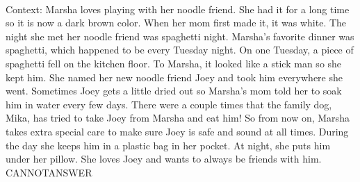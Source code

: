 \documentclass[11pt,a4paper, onecolumn]{article}
\begin{document}
\\ Context: Marsha loves playing with her noodle friend. She had it for a long time so it is now a dark brown color. When her mom first made it, it was white. The night she met her noodle friend was spaghetti night. Marsha's favorite dinner was spaghetti, which happened to be every Tuesday night. On one Tuesday, a piece of spaghetti fell on the kitchen floor. To Marsha, it looked like a stick man so she kept him. She named her new noodle friend Joey and took him everywhere she went. Sometimes Joey gets a little dried out so Marsha's mom told her to soak him in water every few days. There were a couple times that the family dog, Mika, has tried to take Joey from Marsha and eat him! So from now on, Marsha takes extra special care to make sure Joey is safe and sound at all times. During the day she keeps him in a plastic bag in her pocket. At night, she puts him under her pillow. She loves Joey and wants to always be friends with him. CANNOTANSWER
\end{document}
